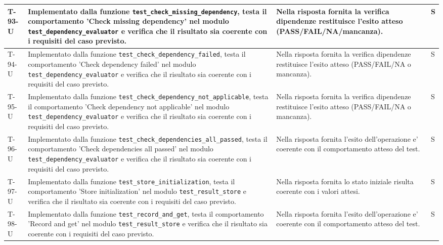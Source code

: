\documentclass[a4paper,12pt]{article}
\begin{document}
{{\begin{longtable}{|>{\RaggedRight\arraybackslash}p{1.55cm}|>{\RaggedRight\arraybackslash}p{8.0cm}|>{\RaggedRight\arraybackslash}p{4.6cm}|>{\RaggedRight\arraybackslash}p{1.2cm}|}
        \hline
        T-93-U & Implementato dalla funzione \texttt{test\_\allowbreak check\_\allowbreak missing\_\allowbreak dependency}, testa il comportamento 'Check missing dependency' nel modulo \texttt{test\_\allowbreak dependency\_\allowbreak evaluator} e verifica che il risultato sia coerente con i requisiti del caso previsto. & Nella risposta fornita la verifica dipendenze restituisce l'esito atteso (PASS/FAIL/NA/mancanza). & S \\
        \hline
        T-94-U & Implementato dalla funzione \texttt{test\_\allowbreak check\_\allowbreak dependency\_\allowbreak failed}, testa il comportamento 'Check dependency failed' nel modulo \texttt{test\_\allowbreak dependency\_\allowbreak evaluator} e verifica che il risultato sia coerente con i requisiti del caso previsto. & Nella risposta fornita la verifica dipendenze restituisce l'esito atteso (PASS/FAIL/NA o mancanza). & S \\
        \hline
        T-95-U & Implementato dalla funzione \texttt{test\_\allowbreak check\_\allowbreak dependency\_\allowbreak not\_\allowbreak applicable}, testa il comportamento 'Check dependency not applicable' nel modulo \texttt{test\_\allowbreak dependency\_\allowbreak evaluator} e verifica che il risultato sia coerente con i requisiti del caso previsto. & Nella risposta fornita la verifica dipendenze restituisce l'esito atteso (PASS/FAIL/NA o mancanza). & S \\
        \hline
        T-96-U & Implementato dalla funzione \texttt{test\_\allowbreak check\_\allowbreak dependencies\_\allowbreak all\_\allowbreak passed}, testa il comportamento 'Check dependencies all passed' nel modulo \texttt{test\_\allowbreak dependency\_\allowbreak evaluator} e verifica che il risultato sia coerente con i requisiti del caso previsto. & Nella risposta fornita l'esito dell'operazione e' coerente con il comportamento atteso del test. & S \\
        \hline
        T-97-U & Implementato dalla funzione \texttt{test\_\allowbreak store\_\allowbreak initialization}, testa il comportamento 'Store initialization' nel modulo \texttt{test\_\allowbreak result\_\allowbreak store} e verifica che il risultato sia coerente con i requisiti del caso previsto. & Nella risposta fornita lo stato iniziale risulta coerente con i valori attesi. & S \\
        \hline
        T-98-U & Implementato dalla funzione \texttt{test\_\allowbreak record\_\allowbreak and\_\allowbreak get}, testa il comportamento 'Record and get' nel modulo \texttt{test\_\allowbreak result\_\allowbreak store} e verifica che il risultato sia coerente con i requisiti del caso previsto. & Nella risposta fornita l'esito dell'operazione e' coerente con il comportamento atteso del test. & S \\

\end{longtable}}}
\end{document}
